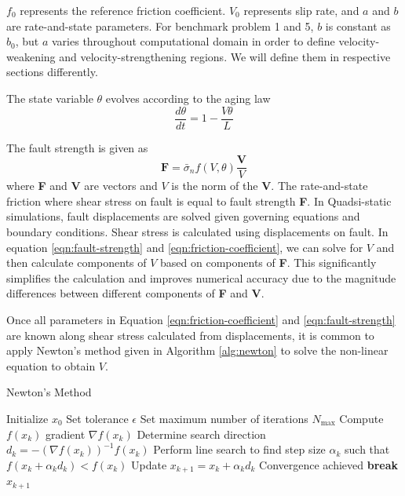 $f_0$ represents the reference friction coefficient. $V_0$ represents slip rate, and $a$ and $b$ are rate-and-state parameters. For benchmark problem 1 and 5, $b$ is constant as $b_0$, but $a$ varies throughout computational domain  in order to define velocity-weakening and velocity-strengthening regions. We will define them in respective sections differently.

The state variable $\theta$ evolves according to the aging law
\begin{equation}
    \frac{d\theta}{dt} = 1 - \frac{V\theta}{L}
    \label{eqn:aging-law}
\end{equation}

The fault strength is given as 
\begin{equation}
    \textbf{F} = \bar{\sigma}_n f(V,\theta) \frac{\textbf{V}}{V}
    \label{eqn:fault-strength}
\end{equation}
where \textbf{F} and \textbf{V} are vectors and $V$ is the norm of the \textbf{V}.
The rate-and-state friction where shear stress on fault is equal to fault strength \textbf{F}.
In Quadsi-static simulations, fault displacements are solved given governing equations and boundary conditions. 
Shear stress is calculated using displacements on fault.
In equation \ref{eqn:fault-strength} and \ref{eqn:friction-coefficient}, we can solve for $V$ and then calculate components of $V$ based on components of \textbf{F}. 
This significantly simplifies the calculation and improves numerical accuracy due to the magnitude differences between different components of \textbf{F} and \textbf{V}.

Once all parameters in Equation \ref{eqn:friction-coefficient} and \ref{eqn:fault-strength} are known along shear stress calculated from displacements, it is common to apply Newton's method given in Algorithm \ref{alg:newton} to solve the non-linear equation to obtain $V$.
\begin{algorithm}
\caption{Newton's Method}
\begin{algorithmic}[1]
\State Initialize $x_0$
\State Set tolerance $\epsilon$
\State Set maximum number of iterations $N_{\max}$
    \State Compute $f(x_k)$ gradient $\nabla f(x_k)$
    \State Determine search direction $d_k = -(\nabla f(x_k))^{-1}f(x_k)$
    \State Perform line search to find step size $\alpha_k$ such that $f(x_k + \alpha_k d_k) < f(x_k)$
    \State Update $x_{k+1} = x_k + \alpha_k d_k$
        \State Convergence achieved
        \State \textbf{break}
    \EndIf
\EndFor
\Return $x_{k+1}$
\end{algorithmic}
\label{alg:newton}
\end{algorithm}

